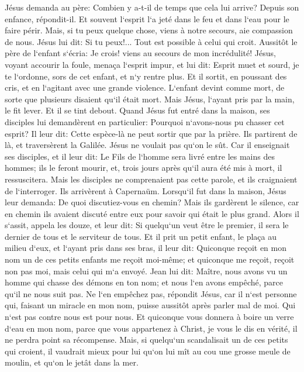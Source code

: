 \verse Jésus demanda au père: Combien y a-t-il de temps que cela lui arrive? Depuis son enfance, répondit-il. 
\verse Et souvent l`esprit l`a jeté dans le feu et dans l`eau pour le faire périr. Mais, si tu peux quelque chose, viens à notre secours, aie compassion de nous. 
\verse Jésus lui dit: Si tu peux!... Tout est possible à celui qui croit. 
\verse Aussitôt le père de l`enfant s`écria: Je crois! viens au secours de mon incrédulité! 
\verse Jésus, voyant accourir la foule, menaça l`esprit impur, et lui dit: Esprit muet et sourd, je te l`ordonne, sors de cet enfant, et n`y rentre plus. 
\verse Et il sortit, en poussant des cris, et en l`agitant avec une grande violence. L`enfant devint comme mort, de sorte que plusieurs disaient qu`il était mort. 
\verse Mais Jésus, l`ayant pris par la main, le fit lever. Et il se tint debout. 
\verse Quand Jésus fut entré dans la maison, ses disciples lui demandèrent en particulier: Pourquoi n`avons-nous pu chasser cet esprit? 
\verse Il leur dit: Cette espèce-là ne peut sortir que par la prière. 
\verse Ils partirent de là, et traversèrent la Galilée. Jésus ne voulait pas qu`on le sût. 
\verse Car il enseignait ses disciples, et il leur dit: Le Fils de l`homme sera livré entre les mains des hommes; ils le feront mourir, et, trois jours après qu`il aura été mis à mort, il ressuscitera. 
\verse Mais les disciples ne comprenaient pas cette parole, et ils craignaient de l`interroger. 
\verse Ils arrivèrent à Capernaüm. Lorsqu`il fut dans la maison, Jésus leur demanda: De quoi discutiez-vous en chemin? 
\verse Mais ils gardèrent le silence, car en chemin ils avaient discuté entre eux pour savoir qui était le plus grand. 
\verse Alors il s`assit, appela les douze, et leur dit: Si quelqu`un veut être le premier, il sera le dernier de tous et le serviteur de tous. 
\verse Et il prit un petit enfant, le plaça au milieu d`eux, et l`ayant pris dans ses bras, il leur dit: 
\verse Quiconque reçoit en mon nom un de ces petits enfants me reçoit moi-même; et quiconque me reçoit, reçoit non pas moi, mais celui qui m`a envoyé. 
\verse Jean lui dit: Maître, nous avons vu un homme qui chasse des démons en ton nom; et nous l`en avons empêché, parce qu`il ne nous suit pas. 
\verse Ne l`en empêchez pas, répondit Jésus, car il n`est personne qui, faisant un miracle en mon nom, puisse aussitôt après parler mal de moi. 
\verse Qui n`est pas contre nous est pour nous. 
\verse Et quiconque vous donnera à boire un verre d`eau en mon nom, parce que vous appartenez à Christ, je vous le dis en vérité, il ne perdra point sa récompense. 
\verse Mais, si quelqu`un scandalisait un de ces petits qui croient, il vaudrait mieux pour lui qu`on lui mît au cou une grosse meule de moulin, et qu`on le jetât dans la mer. 
